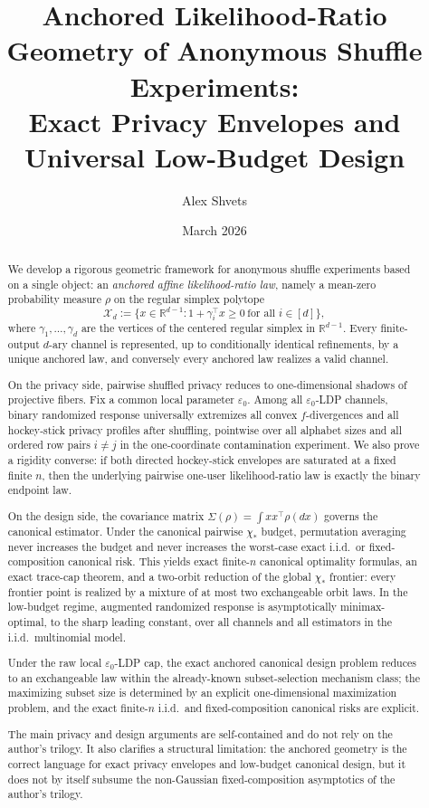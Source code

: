 \documentclass[11pt]{amsart}
\title[Anchored Likelihood-Ratio Geometry of Anonymous Shuffle Experiments]{Anchored Likelihood-Ratio Geometry of Anonymous Shuffle Experiments:\\Exact Privacy Envelopes and Universal Low-Budget Design}
\author{Alex Shvets}
\date{March 2026}
\theoremstyle{definition}
\newcommand{\R}{\mathbb R}
\newcommand{\cX}{\mathcal X}
\begin{document}
\begin{abstract}
We develop a rigorous geometric framework for anonymous shuffle experiments based on a single object: an \emph{anchored affine likelihood-ratio law}, namely a mean-zero probability measure $\rho$ on the regular simplex polytope
\[
\cX_d:=\{x\in\R^{d-1}: 1+\gamma_i^\top x\ge 0\ \text{for all }i\in[d]\},
\]
where $\gamma_1,\dots,\gamma_d$ are the vertices of the centered regular simplex in $\R^{d-1}$. Every finite-output $d$-ary channel is represented, up to conditionally identical refinements, by a unique anchored law, and conversely every anchored law realizes a valid channel.

On the privacy side, pairwise shuffled privacy reduces to one-dimensional shadows of projective fibers. Fix a common local parameter $\varepsilon_0$. Among all $\varepsilon_0$-LDP channels, binary randomized response universally extremizes all convex $f$-divergences and all hockey-stick privacy profiles after shuffling, pointwise over all alphabet sizes and all ordered row pairs $i\neq j$ in the one-coordinate contamination experiment. We also prove a rigidity converse: if both directed hockey-stick envelopes are saturated at a fixed finite $n$, then the underlying pairwise one-user likelihood-ratio law is exactly the binary endpoint law.

On the design side, the covariance matrix $\Sigma(\rho)=\int xx^\top\rho(dx)$ governs the canonical estimator. Under the canonical pairwise $\chi_*$ budget, permutation averaging never increases the budget and never increases the worst-case exact i.i.d.\ or fixed-composition canonical risk. This yields exact finite-$n$ canonical optimality formulas, an exact trace-cap theorem, and a two-orbit reduction of the global $\chi_*$ frontier: every frontier point is realized by a mixture of at most two exchangeable orbit laws. In the low-budget regime, augmented randomized response is asymptotically minimax-optimal, to the sharp leading constant, over all channels and all estimators in the i.i.d.\ multinomial model.

Under the raw local $\varepsilon_0$-LDP cap, the exact anchored canonical design problem reduces to an exchangeable law within the already-known subset-selection mechanism class; the maximizing subset size is determined by an explicit one-dimensional maximization problem, and the exact finite-$n$ i.i.d.\ and fixed-composition canonical risks are explicit.

The main privacy and design arguments are self-contained and do not rely on the author's trilogy. It also clarifies a structural limitation: the anchored geometry is the correct language for exact privacy envelopes and low-budget canonical design, but it does not by itself subsume the non-Gaussian fixed-composition asymptotics of the author's trilogy.
\end{abstract}
\end{document}
